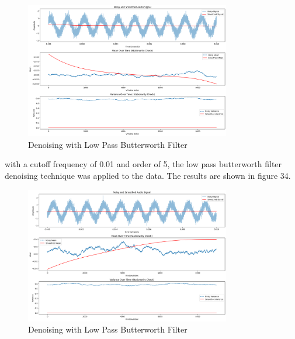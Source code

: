\documentclass[a4paper,12pt]{article} %
\begin{document}
\begin{figure}[h]
\centering
\includegraphics[width=0.8\textwidth]{Q3_LPB_0.01_1.png}
\caption{Denoising with Low Pass Butterworth Filter}
\end{figure}
\clearpage
with a cutoff frequency of 0.01 and order of 5, the low pass butterworth filter denoising technique was applied to the data. The results are shown in figure 34.
\begin{figure}[h]
\centering
\includegraphics[width=0.8\textwidth]{Q3_LPB_0.01_5.png}
\caption{Denoising with Low Pass Butterworth Filter}
\end{figure}

\clearpage
\end{document}
